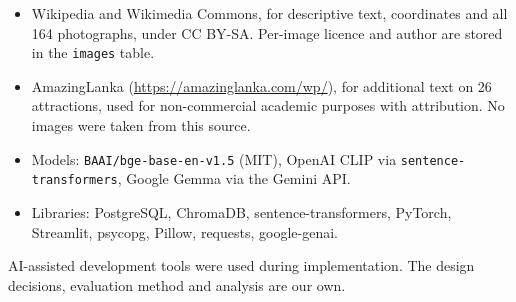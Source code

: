 \documentclass[11pt,a4paper]{article}
\newcommand{\code}[1]{\texttt{\small #1}}
\begin{document}
\begin{itemize}
  \item Wikipedia and Wikimedia Commons, for descriptive text, coordinates
        and all 164 photographs, under CC BY-SA. Per-image licence and
        author are stored in the \code{images} table.
  \item AmazingLanka (\url{https://amazinglanka.com/wp/}), for additional
        text on 26 attractions, used for non-commercial academic purposes
        with attribution. No images were taken from this source.
  \item Models: \code{BAAI/bge-base-en-v1.5} (MIT), OpenAI CLIP via
        \code{sentence-transformers}, Google Gemma via the Gemini API.
  \item Libraries: PostgreSQL, ChromaDB, sentence-transformers, PyTorch,
        Streamlit, psycopg, Pillow, requests, google-genai.
\end{itemize}

AI-assisted development tools were used during implementation. The design
decisions, evaluation method and analysis are our own.
\end{document}
